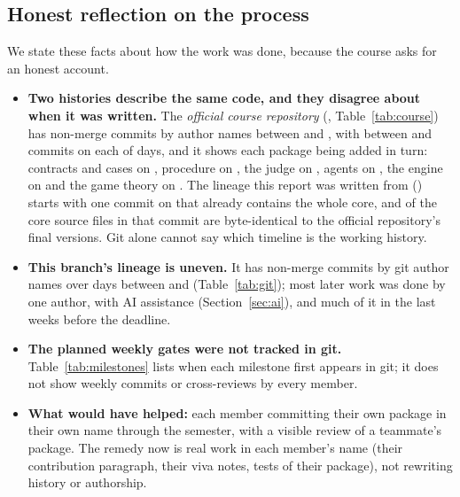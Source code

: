 \subsection{Honest reflection on the process}
We state these facts about how the work was done, because the course asks for an honest account.
\begin{itemize}
\item \textbf{Two histories describe the same code, and they disagree about when it was written.} The \emph{official course repository} (, Table~\ref{tab:course}) has \CourseCommits{} non-merge commits by \CourseAuthors{} author names between \CourseFirst{} and \CourseLast{}, with between \CourseMinPerDay{} and \CourseMaxPerDay{} commits on each of \CourseDays{} days, and it shows each package being added in turn: contracts and cases on \CourseFirstContracts{}, procedure on \CourseFirstProcedure{}, the judge on \CourseFirstJudge{}, agents on \CourseFirstAgents{}, the engine on \CourseFirstEngine{} and the game theory on \CourseFirstGametheory{}. The lineage this report was written from () starts with one commit on \LumpDate{} that already contains the whole core, and \CourseSame{} of the \CourseCore{} core source files in that commit are byte-identical to the official repository's final versions. Git alone cannot say which timeline is the working history. 
\item \textbf{This branch's lineage is uneven.} It has \NCommits{} non-merge commits by \NAuthors{} git author names over \NCommitDays{} days between \FirstCommit{} and \LastCommit{} (Table~\ref{tab:git}); most later work was done by one author, with AI assistance (Section~\ref{sec:ai}), and much of it in the last weeks before the deadline.
\item \textbf{The planned weekly gates were not tracked in git.} Table~\ref{tab:milestones} lists when each milestone first appears in git; it does not show weekly commits or cross-reviews by every member.
\item \textbf{What would have helped:} each member committing their own package in their own name through the semester, with a visible review of a teammate's package. The remedy now is real work in each member's name (their contribution paragraph, their viva notes, tests of their package), not rewriting history or authorship.
\end{itemize}

